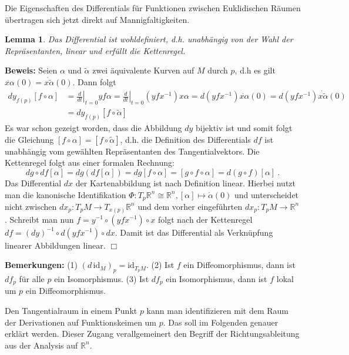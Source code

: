 \documentclass[12pt,a4paper]{article}
\def\R{\mathbb{R}}
\def\id{\mathrm{id}}
\newtheorem{Lemma}{Lemma}[section]
\def\proof{\noindent\textbf{Beweis:}\quad}
\def\qed{\quad\hfill\ensuremath{\Box}}
\begin{document}
\medskip

Die Eigenschaften des Differentials f\"ur Funktionen zwischen Euklidischen R\"aumen \"ubertragen sich jetzt
direkt auf Mannigfaltigkeiten.

\medskip

\begin{Lemma}
Das Differential ist wohldefiniert, d.h. unabh\"angig von der Wahl der Repr\"asentanten, linear
und erf\"ullt die Kettenregel.
\end{Lemma}
\proof
Seien $\alpha$ und $\tilde\alpha$ zwei \"aquivalente Kurven auf $M$ durch $p$, d.h es gilt
$\dot{x\alpha}(0)=\dot{x\tilde\alpha}(0)$. Dann folgt
$$
\begin{array}{rl}
dy_{f(p)} [f\circ \alpha] &= \left.\frac{d}{dt}\right|_{t=0} yf\alpha = \left.\frac{d}{dt}\right|_{t=0} (yfx^{-1})x\alpha
=d (yfx^{-1}) \dot{x\alpha}(0)=d (yfx^{-1}) \dot{x\tilde\alpha}(0)\\[1ex]
&=dy_{f(p)} [f\circ \tilde\alpha]
\end{array}
$$
Es war schon gezeigt worden, dass die Abbildung $dy$ bijektiv ist und somit folgt die Gleichung $[f\circ \alpha]=[f\circ \tilde \alpha]$,
d.h. die Definition des Differentials $df$ ist unabh\"angig vom gew\"ahlten Repr\"asentanten des Tangentialvektors.
Die Kettenregel folgt aus einer formalen Rechnung:
$$
dg \circ df [\alpha] = dg (df [\alpha]) = dg [f\circ \alpha] = [g \circ f \circ \alpha] = d(g\circ f)[\alpha]\ .
$$
Das Differential $dx$ der Kartenabbildung ist nach Definition linear. Hierbei nutzt man die kanonische Identifikation
$\Phi : T_p\R^n \cong \R^n, [\alpha]\mapsto \dot \alpha (0)$ und unterscheidet nicht zwischen $dx_p:T_pM\rightarrow T_{x(p)}\R^n$
und dem vorher eingef\"uhrten $dx_p:T_pM\rightarrow \R^n$. Schreibt man  nun $f= y^{-1}\circ (yfx^{-1})\circ x$ folgt
nach der Kettenregel $df = (dy)^{-1}\circ d(yfx^{-1})\circ dx$. Damit ist das Differential als Verkn\"upfung linearer
Abbildungen linear.
\qed

\bigskip

{\bf Bemerkungen:} (1) $(d\,\id_M)_p = \id_{T_pM}$. (2) Ist $f$ ein Diffeomorphismus, dann ist $df_p$ f\"ur alle $p$ ein
Isomorphismus. (3) Ist $df_p$ ein Isomorphismus, dann ist $f$ lokal um $p$ ein Diffeomorphismus.

\bigskip

Den Tangentialraum in einem Punkt $p$ kann man identifizieren mit dem Raum der Derivationen auf Funktionskeimen um $p$.
Das soll im Folgenden genauer erkl\"art werden. Dieser Zugang verallgemeinert den Begriff der Richtungsableitung
aus der Analysis auf $\R^n$.
\end{document}
